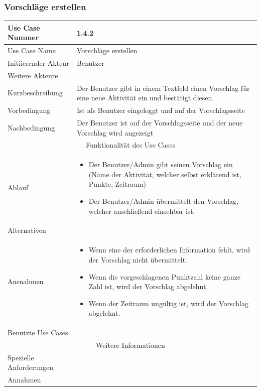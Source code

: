 \documentclass[10pt,a4paper]{article}
\begin{document}
	\subsubsection{Vorschl\"age erstellen}
	\begin{tabularx}{\textwidth}{|l|X|}
		\hline Use Case Nummer & 1.4.2 \\ 
		\hline Use Case Name & Vorschl\"age erstellen \\ 
		\hline Initiierender Akteur & Benutzer \\
		\hline Weitere Akteure & \\
		\hline Kurzbeschreibung & Der Benutzer gibt in einem Textfeld einen Vorschlag für eine neue Aktivit\"at ein und bestätigt diesen. \\
		\hline Vorbedingung & Ist als Benutzer eingeloggt und auf der Vorschlagsseite \\
		\hline Nachbedingung & Der Benutzer ist auf der Vorschlagsseite und der neue Vorschlag wird angezeigt \\
		\hline \multicolumn{2}{|c|}{Funktionalität des Use Cases}\\
		\hline Ablauf & \begin{itemize}
			\item Der Benutzer/Admin gibt seinen Vorschlag ein (Name der Aktivität, welcher selbst erklärend ist, Punkte, Zeitraum)
			\item Der Benutzer/Admin \"ubermittelt den Vorschlag, welcher anschließend einsehbar ist.
		\end{itemize} \\
		\hline Alternativen &  \\
		\hline Ausnahmen & \begin{itemize}
			\item Wenn eine der erforderlichen Information fehlt, wird der Vorschlag nicht \"ubermittelt.
			\item Wenn die vorgeschlagenen Punktzahl keine ganze Zahl ist, wird der Vorschlag abgelehnt.
			\item Wenn der Zeitraum ungültig ist, wird der Vorschlag abgelehnt.
		\end{itemize} \\
		\hline Benutzte Use Cases &  \\
		\hline \multicolumn{2}{|c|}{Weitere Informationen} \\
		\hline Spezielle Anforderungen &  \\
		\hline Annahmen &  \\
		\hline
	\end{tabularx}
        
\end{document}

